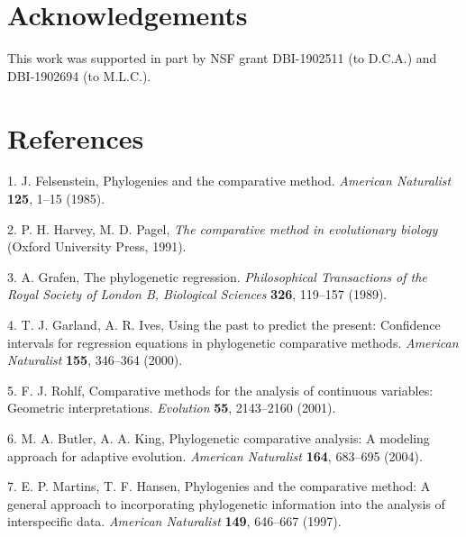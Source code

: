 \documentclass[
]{article}
\begin{document}
\hypertarget{acknowledgements}{%
\section{Acknowledgements}\label{acknowledgements}}

This work was supported in part by NSF grant DBI-1902511 (to D.C.A.) and
DBI-1902694 (to M.L.C.).

\newpage

\hypertarget{references}{%
\section{References}\label{references}}

\setlength{\parindent}{-0.25in} \setlength{\leftskip}{0.25in}
\setlength{\parskip}{8pt} \noindent

\hypertarget{refs}{}
\leavevmode\hypertarget{ref-Felsenstein1985}{}%
1. J. Felsenstein, Phylogenies and the comparative method.
\emph{American Naturalist} \textbf{125}, 1--15 (1985).

\leavevmode\hypertarget{ref-HarveyPagel1991}{}%
2. P. H. Harvey, M. D. Pagel, \emph{The comparative method in
evolutionary biology} (Oxford University Press, 1991).

\leavevmode\hypertarget{ref-Grafen1989}{}%
3. A. Grafen, The phylogenetic regression. \emph{Philosophical
Transactions of the Royal Society of London B, Biological Sciences}
\textbf{326}, 119--157 (1989).

\leavevmode\hypertarget{ref-GarlandIves2000}{}%
4. T. J. Garland, A. R. Ives, Using the past to predict the present:
Confidence intervals for regression equations in phylogenetic
comparative methods. \emph{American Naturalist} \textbf{155}, 346--364
(2000).

\leavevmode\hypertarget{ref-Rohlf2001}{}%
5. F. J. Rohlf, Comparative methods for the analysis of continuous
variables: Geometric interpretations. \emph{Evolution} \textbf{55},
2143--2160 (2001).

\leavevmode\hypertarget{ref-ButlerKing2004}{}%
6. M. A. Butler, A. A. King, Phylogenetic comparative analysis: A
modeling approach for adaptive evolution. \emph{American Naturalist}
\textbf{164}, 683--695 (2004).

\leavevmode\hypertarget{ref-MartinsHansen1997}{}%
7. E. P. Martins, T. F. Hansen, Phylogenies and the comparative method:
A general approach to incorporating phylogenetic information into the
analysis of interspecific data. \emph{American Naturalist} \textbf{149},
646--667 (1997).
\end{document}
